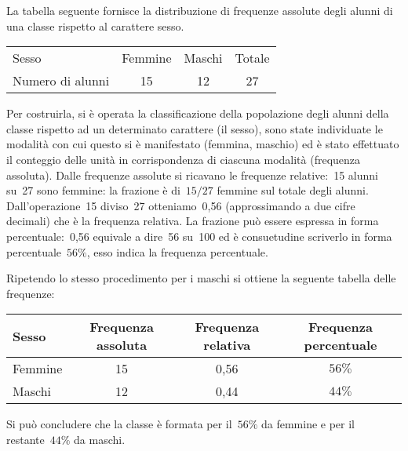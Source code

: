  \begin{esempio}

La tabella seguente fornisce la distribuzione di frequenze assolute degli 
alunni di una classe rispetto al carattere sesso.

\begin{center}
\begin{tabular}{lccc}
\toprule
Sesso &Femmine &Maschi &Totale \\
Numero di alunni & 15 & 12 & 27 \\
\bottomrule
\end{tabular}
\end{center}

Per costruirla, si è operata la classificazione della popolazione degli 
alunni della classe rispetto ad un determinato carattere (il sesso),
sono state individuate le modalità con cui questo si è manifestato 
(femmina, maschio) ed è stato effettuato il conteggio delle unità
in corrispondenza di ciascuna modalità (frequenza assoluta).
Dalle frequenze assolute si ricavano le frequenze relative:~15 alunni su~27 
sono femmine: la frazione è di~$15/27$ femmine sul totale degli alunni. 
Dall'operazione~15
diviso~27 otteniamo~0,56 (approssimando a due cifre decimali) che è la 
frequenza relativa.
La frazione può essere espressa in forma percentuale:~0,56 equivale a 
dire~56 su~100 ed è consuetudine scriverlo in forma percentuale~$56\%$,
esso indica la frequenza percentuale.

Ripetendo lo stesso procedimento per i maschi si ottiene la seguente 
tabella delle frequenze:

\begin{center}
\begin{tabular}{lccc}
\toprule
Sesso & Frequenza assoluta & Frequenza relativa & Frequenza percentuale \\
\midrule
Femmine & 15 & 0,56 & $56\%$ \\
Maschi & 12 & 0,44 & $44\%$ \\
\bottomrule
\end{tabular}
\end{center}
Si può concludere che la classe è formata per il~$56\%$ da femmine e per il 
restante~$44\%$ da maschi.
 \end{esempio}

